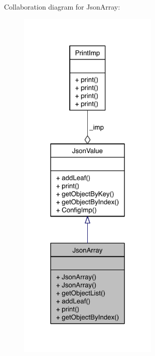Collaboration diagram for Json\-Array\-:
\nopagebreak
\begin{figure}[H]
\begin{center}
\leavevmode
\includegraphics[width=190pt]{class_json_array__coll__graph}
\end{center}
\end{figure}
